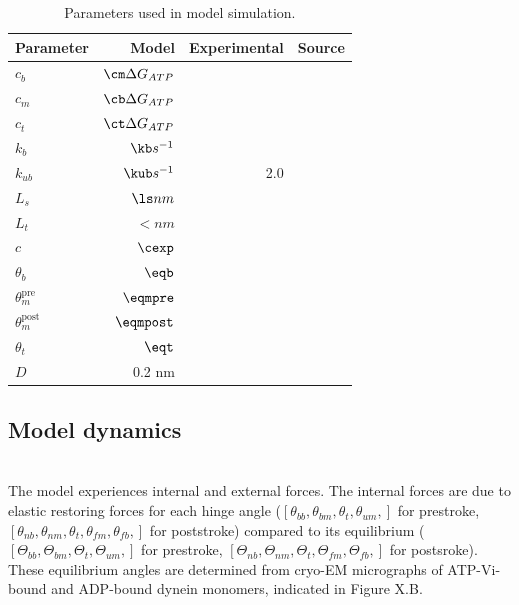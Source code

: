 \documentclass[9pt,twocolumn,twoside]{pnas-new}
\begin{document}
\begin{table}[tbhp]
\centering
\caption{Parameters used in model simulation.}
\label{tab:staticparams}
\begin{tabular}{lrrr}
Parameter & Model & Experimental & Source \\
\midrule
$c_b$ & $\cm \Delta G_{ATP}$ &  & \\
$c_m$ & $\cb \Delta G_{ATP}$ &  & \\
$c_t$ & $\ct \Delta G_{ATP}$ &  & \\
$k_b$ & $\kb s^{-1}$&  & \\
$k_{ub}$ & $\kub s^{-1}$ & 2.0 & \\
$L_s$ & $\ls nm$ & & \cite{burgess-paper}\\
$L_t$ & $\lt nm$ & & \cite{burgess-paper}\\
$c$ & $\cexp$ & & \\
$\theta_b$ & $\eqb$ &  & \\
$\theta_m^{\mbox{pre}}$ & $\eqmpre$ &  & \\
$\theta_m^{\mbox{post}}$ & $\eqmpost$ &  & \\
$\theta_t$ & $\eqt$ &  & \\
$D$ & 0.2 nm &  & \\

\bottomrule
\end{tabular}

\end{table}

\subsection*{Model dynamics}~\\
The model experiences internal and external forces. The internal forces are due to elastic restoring forces for each hinge angle ($\left[\theta_{bb}, \theta_{bm}, \theta_{t}, \theta_{um},\right]$ for prestroke, $\left[\theta_{nb}, \theta_{nm}, \theta_{t}, \theta_{fm}, \theta_{fb},\right]$ for poststroke) compared to its equilibrium ($\left[\Theta_{bb}, \Theta_{bm}, \Theta_{t}, \Theta_{um},\right]$ for prestroke, $\left[\Theta_{nb}, \Theta_{nm}, \Theta_{t}, \Theta_{fm}, \Theta_{fb},\right]$ for postsroke). These equilibrium angles are determined from cryo-EM micrographs of ATP-Vi-bound and ADP-bound dynein monomers, indicated in Figure X.B.\\
\end{document}
